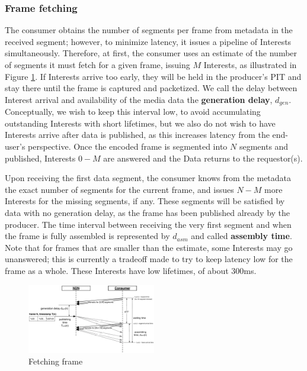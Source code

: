 \documentclass{icn/sig-alternate-2013} %
\begin{document}
\subsubsection{Frame fetching}

The consumer obtains the number of segments per frame from metadata in the received segment; however, to minimize latency, it  issues a pipeline of Interests simultaneously.  Therefore, at first, the consumer uses an estimate of the number of segments it must fetch for a given frame, issuing $M$ Interests, as illustrated in Figure \ref{fig:pull}. If Interests arrive too early, they will be held in the producer's PIT and stay there until the frame is captured and packetized. We call the delay between Interest arrival and availability of the media data the \textbf{generation delay}, $d_{gen}$. Conceptually, we wish to keep this interval low, to avoid accumulating outstanding Interests with short lifetimes, but we also do not wish to have Interests arrive after data is published, as this increases latency from the end-user's perspective.  Once the encoded frame is segmented into $N$ segments and published, Interests $0 - M$ are answered and the Data returns to the requestor(s). 

Upon receiving the first data segment, the consumer knows from the metadata the exact number of segments for the current frame, and issues $N - M$ more Interests for the missing segments, if any. These segments will be satisfied by data with no generation delay, as the frame has been published already by the producer. The time interval between receiving the very first segment and when the frame is fully assembled is represented by $d_{asm}$ and called \textbf{assembly time}. Note that for frames that are smaller than the estimate, some Interests may go unanswered; this is currently a tradeoff made to try to keep latency low for the frame as a whole. These Interests have low lifetimes, of about 300ms. 
 

\begin{figure}[t!]
\centering
\includegraphics[width=0.5\textwidth]{frame-fetch}
\vspace{-18pt}
\caption{Fetching frame}
\label{fig:pull}
\end{figure}
\end{document}
